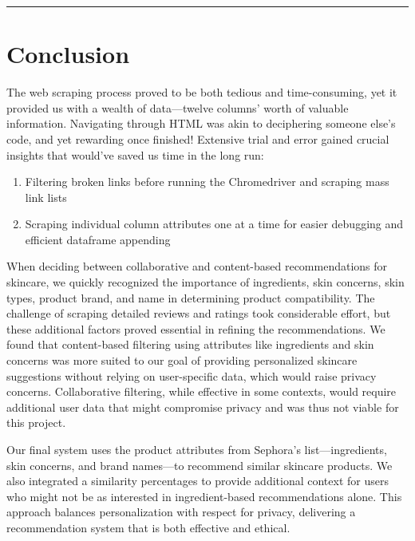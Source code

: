 \documentclass[
]{article}
\providecommand{\tightlist}{%
  \setlength{\itemsep}{0pt}\setlength{\parskip}{0pt}}
\begin{document}
\begin{center}\rule{0.5\linewidth}{0.5pt}\end{center}

\section{Conclusion}\label{conclusion}

The web scraping process proved to be both tedious and time-consuming,
yet it provided us with a wealth of data---twelve columns' worth of
valuable information. Navigating through HTML was akin to deciphering
someone else's code, and yet rewarding once finished! Extensive trial
and error gained crucial insights that would've saved us time in the
long run:

\begin{enumerate}
\def\labelenumi{\arabic{enumi}.}
\tightlist
\item
  Filtering broken links before running the Chromedriver and scraping
  mass link lists
\item
  Scraping individual column attributes one at a time for easier
  debugging and efficient dataframe appending
\end{enumerate}

When deciding between collaborative and content-based recommendations
for skincare, we quickly recognized the importance of ingredients, skin
concerns, skin types, product brand, and name in determining product
compatibility. The challenge of scraping detailed reviews and ratings
took considerable effort, but these additional factors proved essential
in refining the recommendations. We found that content-based filtering
using attributes like ingredients and skin concerns was more suited to
our goal of providing personalized skincare suggestions without relying
on user-specific data, which would raise privacy concerns. Collaborative
filtering, while effective in some contexts, would require additional
user data that might compromise privacy and was thus not viable for this
project.

Our final system uses the product attributes from Sephora's
list---ingredients, skin concerns, and brand names---to recommend
similar skincare products. We also integrated a similarity percentages
to provide additional context for users who might not be as interested
in ingredient-based recommendations alone. This approach balances
personalization with respect for privacy, delivering a recommendation
system that is both effective and ethical.
\end{document}
